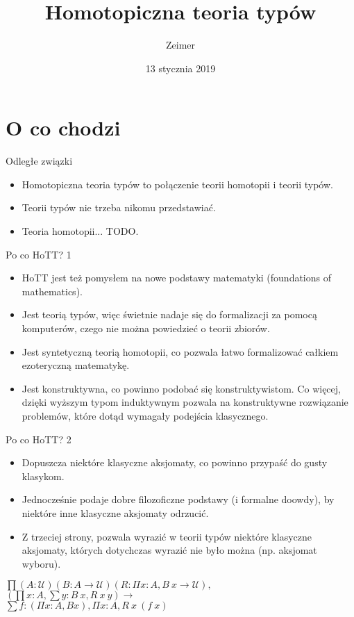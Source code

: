 \documentclass{beamer}
\title{Homotopiczna teoria typów}
\author{Zeimer}
\date{13 stycznia 2019}
\begin{document}
\frame{\titlepage}

\frame{\tableofcontents}

\section{O co chodzi}

\begin{frame}{Odległe związki}
\begin{itemize}
	\item Homotopiczna teoria typów to połączenie teorii homotopii i teorii typów.
	\item Teorii typów nie trzeba nikomu przedstawiać.
	\item Teoria homotopii... TODO.
\end{itemize}
\end{frame}

\begin{frame}{Po co HoTT? 1}
\begin{itemize}
	\item HoTT jest też pomysłem na nowe podstawy matematyki (foundations of mathematics).
	\item Jest teorią typów, więc świetnie nadaje się do formalizacji za pomocą komputerów, czego nie można powiedzieć o teorii zbiorów.
	\item Jest syntetyczną teorią homotopii, co pozwala łatwo formalizować całkiem ezoteryczną matematykę.
	\item Jest konstruktywna, co powinno podobać się konstruktywistom. Co więcej, dzięki wyższym typom induktywnym pozwala na konstruktywne rozwiązanie problemów, które dotąd wymagały podejścia klasycznego.
\end{itemize}
\end{frame}

\begin{frame}{Po co HoTT? 2}
\begin{itemize}
	\item Dopuszcza niektóre klasyczne aksjomaty, co powinno przypaść do gusty klasykom.
	\item Jednocześnie podaje dobre filozoficzne podstawy (i formalne doowdy), by niektóre inne klasyczne aksjomaty odrzucić.
	\item Z trzeciej strony, pozwala wyrazić w teorii typów niektóre klasyczne aksjomaty, których dotychczas wyrazić nie było można (np. aksjomat wyboru).
\end{itemize}
\begin{theorem}
$\textstyle
	\prod (A : \mathcal{U}) (B : A \to \mathcal{U}) (R : \Pi x : A, B\ x \to \mathcal{U}),$ \\
		$(\prod x : A, \sum y : B\ x, R\ x\ y) \to$ \\
			$\sum f : (\Pi x : A, B x), \Pi x : A, R\ x\ (f\ x)$
\end{theorem}
\end{frame}
\end{document}
